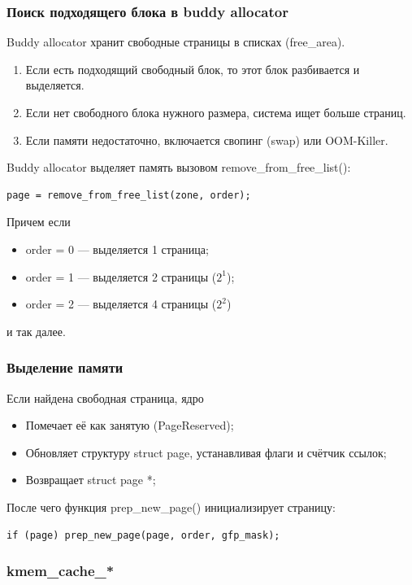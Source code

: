 \subsubsection*{Поиск подходящего блока в buddy allocator}

Buddy allocator хранит свободные страницы в списках (free\_area).

\begin{enumerate}
    \item Если есть подходящий свободный блок, то этот блок разбивается и выделяется.
    \item Если нет свободного блока нужного размера, система ищет больше страниц.
    \item Если памяти недостаточно, включается свопинг (swap) или OOM-Killer.
\end{enumerate}

Buddy allocator выделяет память вызовом remove\_from\_free\_list():
\begin{lstlisting}
page = remove_from_free_list(zone, order);
\end{lstlisting}

Причем если
\begin{itemize}
    \item order = 0 --- выделяется 1 страница;
    \item order = 1 --- выделяется 2 страницы ($2^1$);
    \item order = 2 --- выделяется 4 страницы ($2^2$)
\end{itemize}
и так далее.

\subsubsection*{Выделение памяти}

Если найдена свободная страница, ядро
\begin{itemize}
\item Помечает её как занятую (PageReserved);
\item Обновляет структуру struct page, устанавливая флаги и счётчик ссылок;
\item Возвращает struct page *;
\end{itemize}

После чего функция prep\_new\_page() инициализирует страницу:
\begin{lstlisting}
if (page) prep_new_page(page, order, gfp_mask);
\end{lstlisting}

\subsubsection{kmem\_cache\_*}

